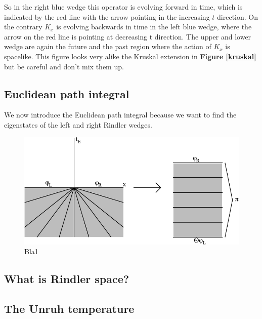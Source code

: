 	So in the right blue wedge this operator is evolving forward in time, which is indicated by the red line with the arrow pointing in the increasing $t$ direction. On the contrary $K_x$ is evolving backwards in time in the left blue wedge, where the arrow on the red line is pointing at decreasing t direction. The upper and lower wedge are again the future and the past region where the action of $K_x$ is spacelike. 
	This figure looks very alike the Kruskal extension in \textbf{Figure \ref{kruskal}} but be careful and don't mix them up.
	\FloatBarrier
	\subsection{Euclidean path integral}
	We now introduce the Euclidean path integral because we want to find the eigenstates of the left and right Rindler wedges. 	
	
	\begin{figure}[tbp]
		\begin{center}
			\includegraphics[scale=1]{eucpath}
			\caption{Bla1}\label{eucpath}
		\end{center}
	\end{figure}
	
	\subsection{What is Rindler space?}
	
	\subsection{The Unruh temperature}
	
